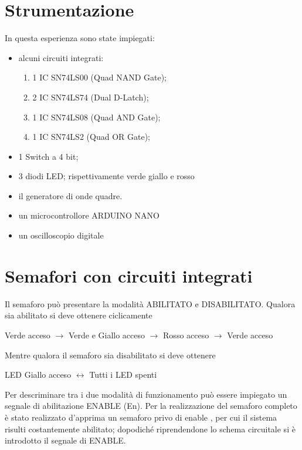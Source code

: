 \section{Strumentazione}
	In questa esperienza sono state impiegati:
	\begin{itemize}
		\item alcuni circuiti integrati:
		\begin{enumerate}
			\item 1 IC SN74LS00 (Quad NAND Gate);
			\item 2 IC SN74LS74 (Dual D-Latch);
			\item 1 IC SN74LS08 (Quad AND Gate);
			\item 1 IC SN74LS2 (Quad OR Gate);
		\end{enumerate}
		\item 1 Switch a 4 bit;
		\item 3 diodi LED; rispettivamente verde giallo e rosso
		\item il generatore di onde quadre.
		\item un microcontrollore ARDUINO NANO
		\item un oscilloscopio digitale
	\end{itemize}
\section{Semafori con circuiti integrati }
Il semaforo può presentare la modalità ABILITATO e DISABILITATO. Qualora sia abilitato si deve ottenere ciclicamente
\begin{center}
	Verde acceso $\longrightarrow$ Verde e
	Giallo acceso $\longrightarrow$ Rosso acceso $\longrightarrow$
	Verde acceso
\end{center}
Mentre qualora il semaforo sia disabilitato si deve ottenere
\begin{center}
	LED Giallo acceso $\leftrightarrow$ Tutti i LED spenti
\end{center}

Per descriminare tra i due modalità di funzionamento può essere impiegato un segnale di abilitazione
ENABLE (En).
Per la realizzazione del semaforo completo è stato realizzato d'apprima un semaforo privo di enable , per cui il sistema risulti costantemente abilitato;
dopodiché riprendendone lo schema circuitale si è introdotto il segnale di ENABLE.
